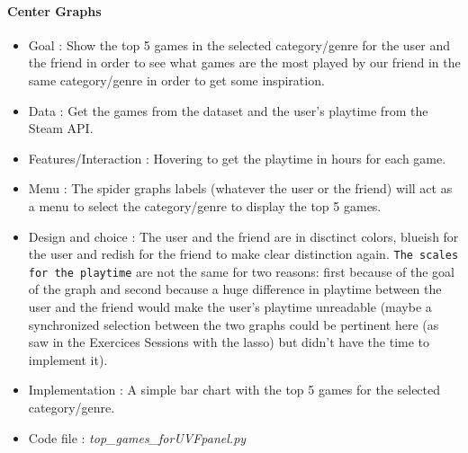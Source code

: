 \documentclass{article}
\begin{document}
	\paragraph{Center Graphs}
	\begin{itemize}
		\item Goal : Show the top 5 games in the selected category/genre for the user and the friend in order to see what games are the most played by our friend in the same category/genre in order to get some inspiration.
		\item Data : Get the games from the dataset and the user's playtime from the Steam API.
		\item Features/Interaction : Hovering to get the playtime in hours for each game.
		\item Menu : The spider graphs labels (whatever the user or the friend) will act as a menu to select the category/genre to display the top 5 games.
		\item Design and choice : The user and the friend are in disctinct colors, blueish for the user and redish for the friend to make clear distinction again. \texttt{The scales for the playtime} are not the same for two reasons: first because of the goal of the graph and second because a huge difference in playtime between the user and the friend would make the user's playtime unreadable (maybe a synchronized selection between the two graphs could be pertinent here (as saw in the Exercices Sessions with the lasso) but didn't have the time to implement it).
		\item Implementation : A simple bar chart with the top 5 games for the selected category/genre.
		\item Code file : \textit{top\_games\_forUVFpanel.py}
	\end{itemize}
	
\end{document}
